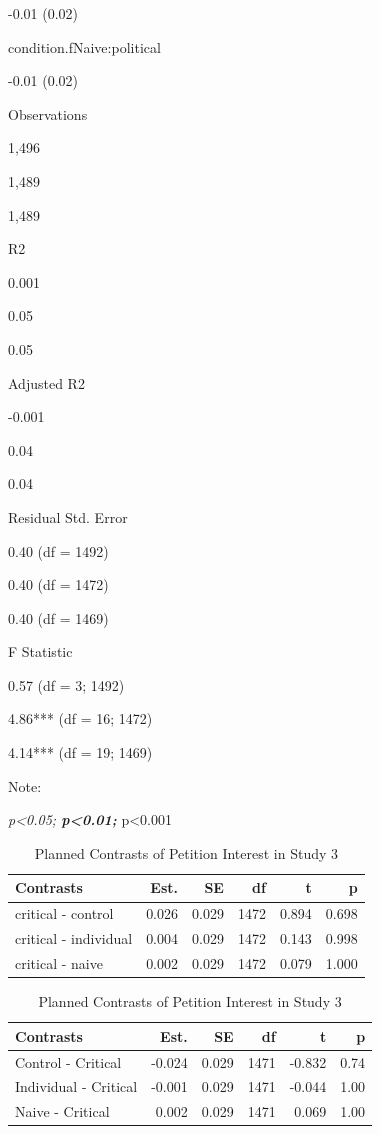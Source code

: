 \documentclass[
]{book}
\begin{document}
-0.01 (0.02)

condition.fNaive:political

-0.01 (0.02)

Observations

1,496

1,489

1,489

R2

0.001

0.05

0.05

Adjusted R2

-0.001

0.04

0.04

Residual Std. Error

0.40 (df = 1492)

0.40 (df = 1472)

0.40 (df = 1469)

F Statistic

0.57 (df = 3; 1492)

4.86*** (df = 16; 1472)

4.14*** (df = 19; 1469)

Note:

\emph{p\textless0.05; \textbf{p\textless0.01; }}p\textless0.001

\begin{table}

\caption{\label{tab:pet2-contrast-s3}Planned Contrasts of Petition Interest in Study 3}
\centering
\begin{tabular}[t]{lrrrrr}
\toprule
Contrasts & Est. & SE & df & t & p\\
\midrule
critical - control & 0.026 & 0.029 & 1472 & 0.894 & 0.698\\
critical - individual & 0.004 & 0.029 & 1472 & 0.143 & 0.998\\
critical - naive & 0.002 & 0.029 & 1472 & 0.079 & 1.000\\
\bottomrule
\end{tabular}
\end{table}

\begin{table}[!hbp]
\caption{\label{tab:pet2-contrast-s3}Planned Contrasts of Petition Interest in Study 3}
\footnotesize
\begin{tabular}[t]{lrrrrr}
\toprule
Contrasts & Est. & SE & df & t & p\\
\midrule
Control - Critical & -0.024 & 0.029 & 1471 & -0.832 & 0.74\\
Individual - Critical & -0.001 & 0.029 & 1471 & -0.044 & 1.00\\
Naive - Critical & 0.002 & 0.029 & 1471 & 0.069 & 1.00\\
\bottomrule
\end{tabular}
\end{table}
\end{document}
